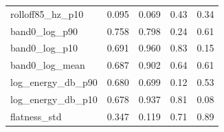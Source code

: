 \documentclass[11pt,a4paper]{article}
\begin{document}
\begin{center}
\begin{longtable}{>{\raggedright\arraybackslash}p{4.20cm}>{\raggedleft\arraybackslash}p{2.55cm}>{\raggedleft\arraybackslash}p{2.55cm}>{\raggedleft\arraybackslash}p{2.55cm}>{\raggedleft\arraybackslash}p{2.55cm}}
\hspace{0pt}rolloff85\_\allowbreak{}hz\_\allowbreak{}p10 & \hspace{0pt}0.095 & \hspace{0pt}0.069 & \hspace{0pt}0.43 & \hspace{0pt}0.34\\
\hspace{0pt}band0\_\allowbreak{}log\_\allowbreak{}p90 & \hspace{0pt}0.758 & \hspace{0pt}0.798 & \hspace{0pt}0.24 & \hspace{0pt}0.61\\
\hspace{0pt}band0\_\allowbreak{}log\_\allowbreak{}p10 & \hspace{0pt}0.691 & \hspace{0pt}0.960 & \hspace{0pt}0.83 & \hspace{0pt}0.15\\
\hspace{0pt}band0\_\allowbreak{}log\_\allowbreak{}mean & \hspace{0pt}0.687 & \hspace{0pt}0.902 & \hspace{0pt}0.64 & \hspace{0pt}0.61\\
\hspace{0pt}log\_\allowbreak{}energy\_\allowbreak{}db\_\allowbreak{}p90 & \hspace{0pt}0.680 & \hspace{0pt}0.699 & \hspace{0pt}0.12 & \hspace{0pt}0.53\\
\hspace{0pt}log\_\allowbreak{}energy\_\allowbreak{}db\_\allowbreak{}p10 & \hspace{0pt}0.678 & \hspace{0pt}0.937 & \hspace{0pt}0.81 & \hspace{0pt}0.08\\
\hspace{0pt}flatness\_\allowbreak{}std & \hspace{0pt}0.347 & \hspace{0pt}0.119 & \hspace{0pt}0.71 & \hspace{0pt}0.89\\

\end{longtable}
\end{center}
\end{document}
